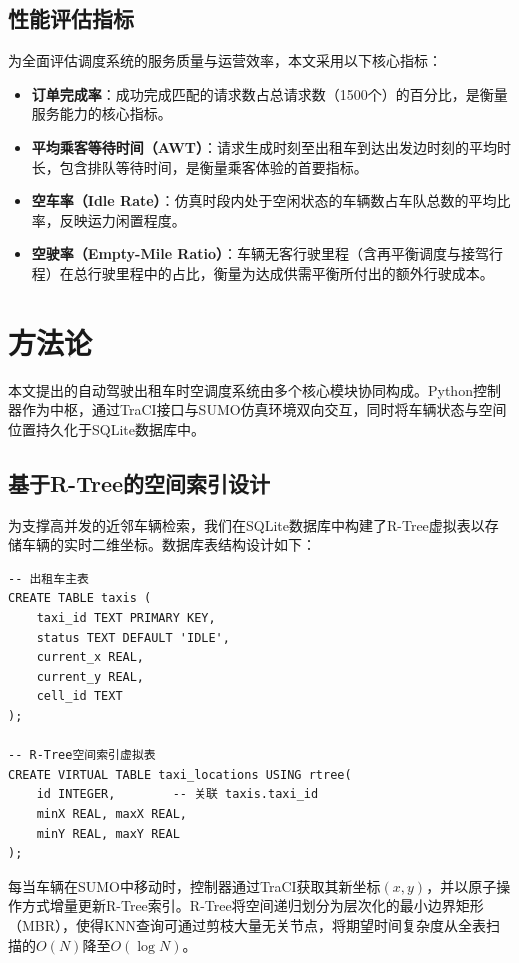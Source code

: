 \documentclass[conference]{IEEEtran}
\begin{document}
\subsection{性能评估指标}
为全面评估调度系统的服务质量与运营效率，本文采用以下核心指标：
\begin{itemize}
    \item \textbf{订单完成率}：成功完成匹配的请求数占总请求数（1500个）的百分比，是衡量服务能力的核心指标。
    \item \textbf{平均乘客等待时间（AWT）}：请求生成时刻至出租车到达出发边时刻的平均时长，包含排队等待时间，是衡量乘客体验的首要指标。
    \item \textbf{空车率（Idle Rate）}：仿真时段内处于空闲状态的车辆数占车队总数的平均比率，反映运力闲置程度。
    \item \textbf{空驶率（Empty-Mile Ratio）}：车辆无客行驶里程（含再平衡调度与接驾行程）在总行驶里程中的占比，衡量为达成供需平衡所付出的额外行驶成本。
\end{itemize}

\section{方法论}

本文提出的自动驾驶出租车时空调度系统由多个核心模块协同构成。Python控制器作为中枢，通过TraCI接口与SUMO仿真环境双向交互，同时将车辆状态与空间位置持久化于SQLite数据库中。

\subsection{基于R-Tree的空间索引设计}
为支撑高并发的近邻车辆检索，我们在SQLite数据库中构建了R-Tree虚拟表以存储车辆的实时二维坐标。数据库表结构设计如下：

\begin{verbatim}
-- 出租车主表
CREATE TABLE taxis (
    taxi_id TEXT PRIMARY KEY,
    status TEXT DEFAULT 'IDLE',
    current_x REAL,
    current_y REAL,
    cell_id TEXT
);

-- R-Tree空间索引虚拟表
CREATE VIRTUAL TABLE taxi_locations USING rtree(
    id INTEGER,        -- 关联 taxis.taxi_id
    minX REAL, maxX REAL,
    minY REAL, maxY REAL
);
\end{verbatim}

每当车辆在SUMO中移动时，控制器通过TraCI获取其新坐标\((x,y)\)，并以原子操作方式增量更新R-Tree索引。R-Tree将空间递归划分为层次化的最小边界矩形（MBR），使得KNN查询可通过剪枝大量无关节点，将期望时间复杂度从全表扫描的\(O(N)\)降至\(O(\log N)\)。
\end{document}
